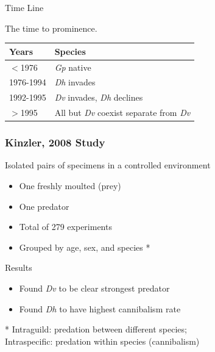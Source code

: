 \begin{frame}{Time Line}

  \vfill

  The time to prominence. 

  \vfill

  \begin{tabular}{l|l}
    Years      & Species \\ \hline
    $<$1976    & \textit{Gp} native\\
    1976-1994  & \textit{Dh} invades\\
    1992-1995  & \textit{Dv} invades, \textit{Dh} declines\\
    $>$1995    & All but \textit{Dv} coexist separate from \textit{Dv}
  \end{tabular}

  \vfill

\end{frame}


\begin{frame}
   \frametitle{Kinzler, 2008 Study}
	\vfill
	
	Isolated pairs of specimens in a controlled environment
	\begin{itemize}
		\item One freshly moulted (prey) 
		\item One predator
		\item Total of 279 experiments
		\item Grouped by age, sex, and species \**
	\end{itemize}
	
\vfill
	Results\\
\begin{itemize}
	\item Found \textit{Dv} to be clear strongest predator\\
\vspace{.5em}
	\item Found \textit{Dh} to have highest cannibalism rate
\end{itemize}

\vfill

\** Intraguild: predation between different species;\\ 
\hspace{.5em} Intraspecific: predation within species (cannibalism)

\end{frame}


